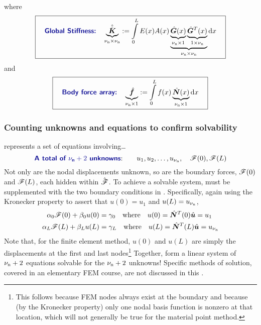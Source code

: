 where
\begin{equation}
\boxit{\quad
\text{\Defn{Global Stiffness:}}\quad
  \underbrace{\AArray{K}}_{\numnodes\by\numnodes}\definedEqual\int\limits_0^L E(x)A(x)  \underbrace{\underbrace{\gradNBFa(x)}_{\numnodes\by1} \underbrace{\gradNBFa^T(x)}_{1\by\numnodes}}_{\numnodes\by\numnodes} \dd x
\quad}
\label{eq:linearBarGlobalStiffness}
\end{equation}
and
\begin{equation}
\boxit{\quad
\text{\Defn{Body force array:}}\quad
  \underbrace{\Array{f}}_{\numnodes\by1}
\definedEqual
\int\limits_0^L f(x)\underbrace{\NBFa(x)}_{\numnodes\by1}\dd x
\quad}
\label{eq:linearBarBodyForceArray}
\end{equation}

\subsubsection{Counting unknowns and equations to confirm solvability}
 represents a set of \numnodes equations involving\ldots
\begin{equation}
 \text{\Defn{A total of $\numnodes+2$ unknowns}:}\qquad u_1, u_2, \ldots, u_\numnodes,\quad \tractionForce(0), \tractionForce(L)
\end{equation}
Not only are the nodal displacements unknown, so are the boundary forces, $\mathscr{F}(0)$ and $\mathscr{F}(L)$, each hidden within $\hat{\bm{\mathscr{F}}}$.  To achieve a solvable system,  must be supplemented with the two boundary conditions in .  Specifically, again using the Kronecker property to assert that $u(0)=u_1$ and $u(L)=u_{\nu_\text{n}}$,
\begin{equation}
\begin{aligned}
\alpha_0 \mathscr{F}(0)+\beta_0 u(0)&=\gamma_0
   \quad\text{where}\quad
   u(0)=\hat{\bm{N}}^T(0)\hat{\bm{u}}=u_1
\\
\alpha_L \mathscr{F}(L)+\beta_L u(L)&=\gamma_L 
   \quad\text{where}\quad
   u(L)=\hat{\bm{N}}^T(L)\hat{\bm{u}}=u_{\nu_\text{n}}
\end{aligned}
\label{eq:LinearBarStrongFormBCs}
\end{equation}
Note that, for the finite element method, $u(0)$ and $u(L)$ are simply the displacements at the first and last nodes\footnote{This follows because FEM nodes always exist at the boundary and because (by the Kronecker property) only one nodal basis function is nonzero at that location, which will not generally be true for the material point method.}
Together,  form a  linear system of ${\nu_\text{n}}+2$ equations solvable for the ${\nu_\text{n}}+2$ unknowns!  Specific methods of solution, covered in an elementary FEM course, are not discussed in this \manuscript.

